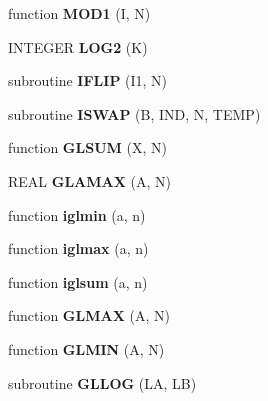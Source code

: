 \begin{CompactItemize}
\item 
\hypertarget{mat1_8F_72af5b4b7c6d1adc583cf8430ba3f45b}{
function \textbf{MOD1} (I, N)}
\label{mat1_8F_72af5b4b7c6d1adc583cf8430ba3f45b}

\item 
\hypertarget{mat1_8F_14acd5509eae0240f46bdeca4b5555f7}{
INTEGER \textbf{LOG2} (K)}
\label{mat1_8F_14acd5509eae0240f46bdeca4b5555f7}

\item 
\hypertarget{mat1_8F_54dff2ea245c8687223f18d45b00d5e3}{
subroutine \textbf{IFLIP} (I1, N)}
\label{mat1_8F_54dff2ea245c8687223f18d45b00d5e3}

\item 
\hypertarget{mat1_8F_15c4604b6ebed464c10199ba294311d8}{
subroutine \textbf{ISWAP} (B, IND, N, TEMP)}
\label{mat1_8F_15c4604b6ebed464c10199ba294311d8}

\item 
\hypertarget{mat1_8F_f1e623dcf8ccc217266a1571c77ad829}{
function \textbf{GLSUM} (X, N)}
\label{mat1_8F_f1e623dcf8ccc217266a1571c77ad829}

\item 
\hypertarget{mat1_8F_c252b56fc40a42f386c0f20053f30cbd}{
REAL \textbf{GLAMAX} (A, N)}
\label{mat1_8F_c252b56fc40a42f386c0f20053f30cbd}

\item 
\hypertarget{mat1_8F_bddb480a4c33726fd422e964eff2a033}{
function \textbf{iglmin} (a, n)}
\label{mat1_8F_bddb480a4c33726fd422e964eff2a033}

\item 
\hypertarget{mat1_8F_8431e1799f5711943b2e061a602754ca}{
function \textbf{iglmax} (a, n)}
\label{mat1_8F_8431e1799f5711943b2e061a602754ca}

\item 
\hypertarget{mat1_8F_269b9bcae973eb49454422b00e319706}{
function \textbf{iglsum} (a, n)}
\label{mat1_8F_269b9bcae973eb49454422b00e319706}

\item 
\hypertarget{mat1_8F_18e421fd0e58ce5e9a0287f8daa3b3d5}{
function \textbf{GLMAX} (A, N)}
\label{mat1_8F_18e421fd0e58ce5e9a0287f8daa3b3d5}

\item 
\hypertarget{mat1_8F_7326d76cd6c828e1135d707b1284d264}{
function \textbf{GLMIN} (A, N)}
\label{mat1_8F_7326d76cd6c828e1135d707b1284d264}

\item 
\hypertarget{mat1_8F_d863ed9ddc292c590539fb300ba2ced4}{
subroutine \textbf{GLLOG} (LA, LB)}
\label{mat1_8F_d863ed9ddc292c590539fb300ba2ced4}


\end{CompactItemize}
